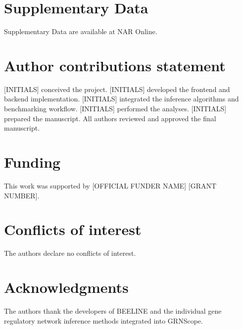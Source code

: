 \documentclass[unnumsec,webpdf,modern,large]{oup-authoring-template}%
\begin{document}
\section{Supplementary Data}

Supplementary Data are available at NAR Online.

\section{Author contributions statement}

[INITIALS] conceived the project. [INITIALS] developed the frontend and backend implementation. [INITIALS] integrated the inference algorithms and benchmarking workflow. [INITIALS] performed the analyses. [INITIALS] prepared the manuscript. All authors reviewed and approved the final manuscript.

\section{Funding}

This work was supported by [OFFICIAL FUNDER NAME] [GRANT NUMBER].

\section{Conflicts of interest}

The authors declare no conflicts of interest.

\section{Acknowledgments}

The authors thank the developers of BEELINE and the individual gene regulatory network inference methods integrated into GRNScope.
\end{document}
